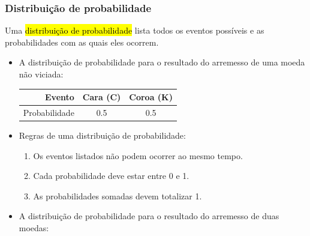\begin{frame}
\frametitle{Distribuição de probabilidade}
\justifying
Uma \hl{distribuição de probabilidade} lista todos os eventos possíveis e as probabilidades com as quais eles ocorrem.

\begin{itemize}
\justifying
\item A distribuição de probabilidade para o resultado do arremesso de uma moeda não viciada:
{\footnotesize 
\begin{center}
\begin{tabular}{r | c | c}
Evento    & Cara (C)		& Coroa (K) \\
\hline
Probabilidade	& 0.5		& 0.5 \\
\end{tabular}
\end{center}
}
\vspace{0.1cm}
\pause
\justifying
\item Regras de uma distribuição de probabilidade:
\begin{enumerate}
\justifying
\item Os eventos listados não podem ocorrer ao mesmo tempo.
\justifying
\item Cada probabilidade deve estar entre 0 e 1.
\justifying
\item As probabilidades somadas devem totalizar 1.
\end{enumerate}

\pause
\justifying
\item A distribuição de probabilidade para o resultado do arremesso de duas moedas:

\end{itemize}

\end{frame}


